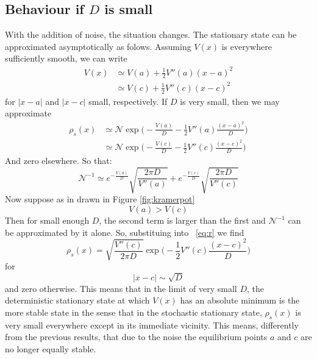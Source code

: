 \subsection{Behaviour if $D$ is small}
With the addition of noise, the situation changes. The stationary state can be approximated asymptotically as folows. Assuming $V(x)$ is everywhere sufficiently smooth, we can write
\begin{equation}
\begin{split}
V(x) & \simeq V(a) + \frac{1}{2} V''(a)(x-a)^2 \\
& \simeq V(c) + \frac{1}{2} V''(c)(x-c)^2 
\end{split}
\end{equation}
for $|x-a|$ and $|x-c|$ small, respectively.
If $D$ is very small, then we may approximate
\begin{equation}
\begin{split}
\rho_s(x)  &\simeq \mathcal{N} \exp\biggl(-\frac{V(a)}{D} - \frac{1}{2} V''(a)\frac{(x-a)^2}{D}\biggr) \\
&\simeq \mathcal{N} \exp\biggl(-\frac{V(c)}{D} - \frac{1}{2} V''(c)\frac{(x-c)^2}{D}\biggr) 
\end{split}
\label{eq:r}
\end{equation}
And zero elsewhere.
So that:
\begin{equation}
\mathcal{N}^{-1}  \simeq e^{-\frac{V(a)}{D}} \sqrt{\frac{ 2 \pi D }{V''(a)}} + e^{-\frac{V(c)}{D}} \sqrt{\frac{ 2 \pi D }{V''(c)}}
\end{equation}
Now suppose as in drawn in Figure \ref{fig:kramerpot} 
$$
V(a)>V(c)
$$
Then for small enough $D$, the second term is larger than the first and $\mathcal{N}^{-1}$ can be approximated by it alone. So, substituing into ~\ref{eq:r} we find
\begin{equation}
\rho_s(x) = \sqrt{\frac{V''(c)}{2 \pi D}} \exp\biggl(-\frac{1}{2}V''(c)\frac{(x-c)^2}{D}\biggr)
\end{equation}
for 
$$
|x-c| \sim \sqrt{D}
$$
and zero otherwise.
This means that in the limit of very small $D$, the deterministic stationary state at which $V(x)$ has an absolute minimum is the more stable state in the sense that in the stochastic stationary state, $\rho_s(x)$ is very small everywhere except in its immediate vicinity. This means, differently from the previous results, that due to the noise the  equilibrium points $a$ and $c$ are no longer equally stable.








